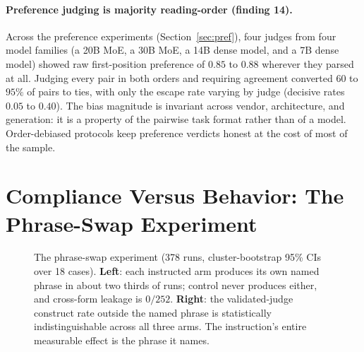 \documentclass[11pt]{article}
\begin{document}
\paragraph{Preference judging is majority reading-order (finding 14).}
Across the preference experiments (Section~\ref{sec:pref}), four
judges from four model families (a 20B MoE, a 30B MoE, a 14B dense
model, and a 7B dense model) showed raw first-position preference of
$0.85$ to $0.88$ wherever they parsed at all. Judging every pair in
both orders and requiring agreement converted $60$ to $95\%$ of pairs
to ties, with only the escape rate varying by judge (decisive rates
$0.05$ to $0.40$). The bias magnitude is invariant across vendor,
architecture, and generation: it is a property of the pairwise task
format rather than of a model. Order-debiased protocols keep preference
verdicts honest at the cost of most of the sample.

\section{Compliance Versus Behavior: The Phrase-Swap Experiment}
\label{sec:phrase}

\begin{figure}[t]
\centering
{}\hfill
{}
\caption{The phrase-swap experiment (378 runs, cluster-bootstrap 95\%
CIs over 18 cases). \textbf{Left}: each instructed arm produces its own
named phrase in about two thirds of runs; control never produces
either, and cross-form leakage is $0/252$. \textbf{Right}: the
validated-judge construct rate outside the named phrase is
statistically indistinguishable across all three arms. The
instruction's entire measurable effect is the phrase it names.}
\label{fig:swap}
\end{figure}
\end{document}
